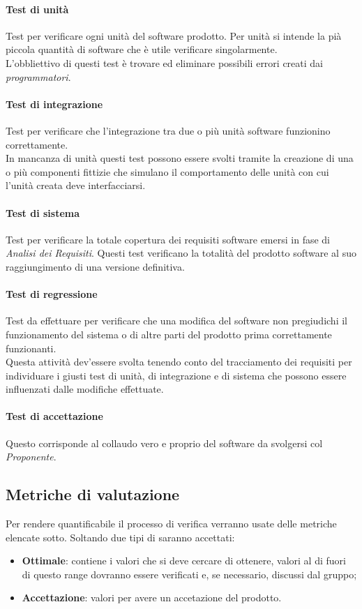 \documentclass{scalatekids-article}
\begin{document}
\paragraph{Test di unità}
Test per verificare ogni unità del software prodotto. Per unità si intende la pià piccola quantità di software che è utile verificare singolarmente.\\L'obbliettivo di questi test è trovare ed eliminare possibili errori creati dai \textit{programmatori}.
\paragraph{Test di integrazione}
Test per verificare che l'integrazione tra due o più unità software funzionino correttamente.\\In mancanza di unità questi test possono essere svolti tramite la creazione di una o più componenti fittizie che simulano il comportamento delle unità con cui l'unità creata deve interfacciarsi. %
\paragraph{Test di sistema}
Test per verificare la totale copertura dei requisiti software emersi in fase di \textit{Analisi dei Requisiti}. Questi test verificano la totalità del prodotto software al suo raggiungimento di una versione definitiva.
\paragraph{Test di regressione}
Test da effettuare per verificare che una modifica del software non pregiudichi il funzionamento del sistema o di altre parti del prodotto prima correttamente funzionanti.\\
Questa attività dev'essere svolta tenendo conto del tracciamento dei requisiti per individuare i giusti test di unità, di integrazione e di sistema che possono essere influenzati dalle modifiche effettuate.\\
\paragraph{Test di accettazione}
Questo corrisponde al collaudo vero e proprio del software da svolgersi col \textit{Proponente}.

\subsection{Metriche di valutazione}
Per rendere quantificabile il processo di verifica verranno usate delle metriche elencate sotto. Soltando due tipi di  saranno accettati:
\begin{itemize}
  \item \textbf{Ottimale}: contiene i valori che si deve cercare di ottenere, valori al di fuori di questo range dovranno essere verificati e, se necessario, discussi dal gruppo;
  \item \textbf{Accettazione}: valori per avere un accetazione del prodotto.
\end{itemize}
\end{document}
